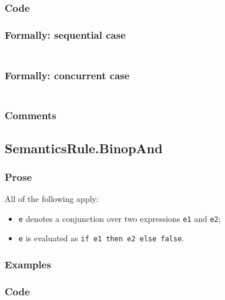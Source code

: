 \documentclass{book}
\begin{document}
  \subsubsection{Code}

  \subsubsection{Formally: sequential case}
  \begin{align}
  \end{align} 

  \subsubsection{Formally: concurrent case}
  \begin{align}
  \end{align} 

  \subsubsection{Comments}

\subsection{SemanticsRule.BinopAnd \label{sec:SemanticsRule.BinopAnd}}

  \subsubsection{Prose}
  All of the following apply:
  \begin{itemize}
  \item \texttt{e} denotes a conjunction over two expressions \texttt{e1} and \texttt{e2};
  \item \texttt{e} is evaluated as \texttt{if e1 then e2 else false}.
  \end{itemize}

  \subsubsection{Examples}

  \subsubsection{Code}
\end{document}

